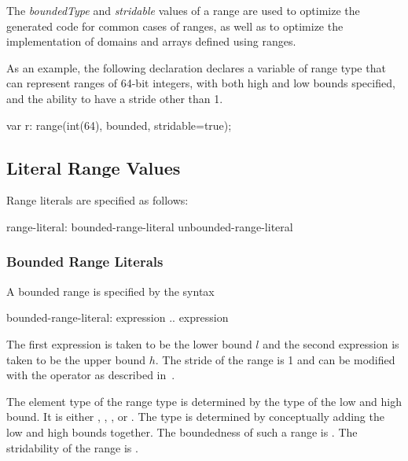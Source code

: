 \begin{rationale}
The \emph{boundedType} and \emph{stridable} values of a range are used
to optimize the generated code for common cases of ranges, as well as
to optimize the implementation of domains and arrays defined using
ranges.
\end{rationale}

\begin{example}
As an example, the following declaration declares a variable 
of range type that can represent ranges of 64-bit integers, with both
high and low bounds specified, and the ability to have a stride other
than 1.
\begin{chapel}
var r: range(int(64), bounded, stridable=true);
\end{chapel}
\end{example}

\subsection{Literal Range Values}
\label{Range_Literals}

Range literals are specified as follows:
\begin{syntax}
range-literal:
  bounded-range-literal
  unbounded-range-literal
\end{syntax}

\subsubsection{Bounded Range Literals}
\label{Bounded_Ranges}

A bounded range is specified by the syntax
\begin{syntax}
bounded-range-literal:
  expression .. expression
\end{syntax}
The first expression is taken to be the lower bound $l$ and the second
expression is taken to be the upper bound $h$.  The stride of the
range is 1 and can be modified with the  operator as described
in~.

The element type of the range type is determined by the type of the
low and high bound.  It is either , ,
, or .  The type is determined by
conceptually adding the low and high bounds together.  The boundedness
of such a range is .  The stridability of the range is
.

